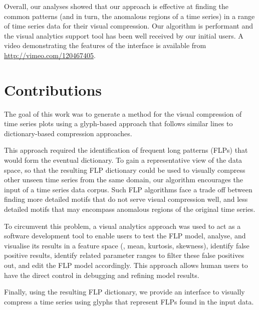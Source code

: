 Overall, our analyses showed that our approach is effective at finding the common patterns (and in turn, the anomalous regions of a time series) in a range of time series data for their visual compression.
Our algorithm is performant and the visual analytics support tool has been well received by our initial users.
A video demonstrating the features of the interface is available from \url{http://vimeo.com/120467405}.

\section{Contributions}

The goal of this work was to generate a method for the visual compression of time series plots using a glyph-based approach that follows similar lines to dictionary-based compression approaches.

This approach required the identification of frequent long patterns (FLPs) that would form the eventual dictionary.
To gain a representative view of the data space, so that the resulting FLP dictionary could be used to visually compress other unseen time series from the same domain, our algorithm encourages the input of a time series data corpus.
Such FLP algorithms face a trade off between finding more detailed motifs that do not serve visual compression well, and less detailed motifs that may encompass anomalous regions of the original time series.

To circumvent this problem, a visual analytics approach was used to act as a software development tool to enable users to test the FLP model, analyse, and visualise its results in a feature space (\eg, mean, kurtosis, skewness), identify false positive results, identify related parameter ranges to filter these false positives out, and edit the FLP model accordingly.
This approach allows human users to have the direct control in debugging and refining model results.

Finally, using the resulting FLP dictionary, we provide an interface to visually compress a time series using glyphs that represent FLPs found in the input data.
